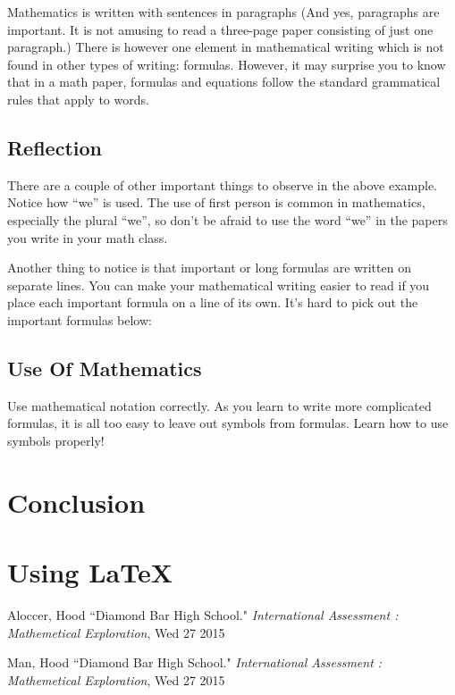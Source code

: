 \documentclass[11pt]{article}
\begin{document}
Mathematics is written with sentences in paragraphs (And yes, paragraphs are important. It is not amusing to read a three-page paper consisting of just one paragraph.) There is however one element in mathematical writing which is not found in other types of writing: formulas. However, it may surprise you to know that in a math paper, formulas and equations follow the standard grammatical rules that apply to words.
\subsection{Reflection}
There are a couple of other important things to observe in the above example. Notice how “we” is used. The use of first person is common in mathematics, especially the plural “we”, so don’t be afraid to use the word “we” in the papers you write in your math class.

Another thing to notice is that important or long formulas are written on separate lines. You can make your mathematical writing easier to read if you place each important formula on a line of its own. It’s hard to pick out the important formulas below:

\subsection{Use Of Mathematics}
Use mathematical notation correctly. As you learn to write more complicated formulas, it is all too easy to leave out symbols from formulas. Learn how to use symbols properly!

\section{Conclusion}

\section{Using \LaTeX\ }

\pagebreak
\begin{thebibliography}{}

Aloccer, Hood
``Diamond Bar High School."
\textit{International Assessment : Mathemetical Exploration},
Wed 27 2015


Man, Hood
``Diamond Bar High School."
\textit{International Assessment : Mathemetical Exploration},
Wed 27 2015
\end{thebibliography}
\end{document}
